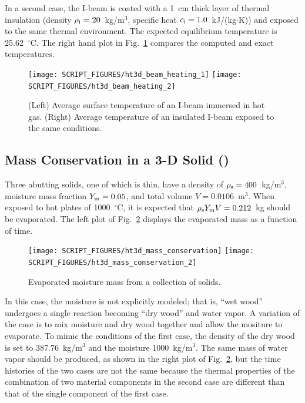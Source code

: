 \documentclass[11pt]{book}
\begin{document}
In a second case, the I-beam is coated with a 1~cm thick layer of thermal insulation (density $\rho_{\rm i}=20$~kg/m$^3$, specific heat $c_{\rm i}=1.0$~kJ/(kg$\cdot$K)) and exposed to the same thermal environment. The expected equilibrium temperature is 25.62~$^\circ$C. The right hand plot in Fig.~\ref{fig:ht3d_beam_heating} compares the computed and exact temperatures.

\begin{figure}[ht]
\texttt{[image: SCRIPT\_FIGURES/ht3d\_beam\_heating\_1]}
\texttt{[image: SCRIPT\_FIGURES/ht3d\_beam\_heating\_2]}
\caption[The  test cases]{(Left) Average surface temperature of an I-beam immersed in hot gas. (Right) Average temperature of an insulated I-beam exposed to the same conditions.}
\label{fig:ht3d_beam_heating}
\end{figure}

\FloatBarrier


\subsection{Mass Conservation in a 3-D Solid (\texorpdfstring{}{ht3d\_mass\_conservation})}
\label{ht3d_mass_conservation}

Three abutting solids, one of which is thin, have a density of $\rho_{\rm s}=400$~kg/m$^3$, moisture mass fraction $Y_{\rm m}=0.05$, and total volume $V=0.0106$~m$^3$. When exposed to hot plates of 1000~$^\circ$C, it is expected that $\rho_{\rm s} Y_{\rm m} V=0.212$~kg should be evaporated. The left plot of Fig.~\ref{fig:ht3d_mass_conservation} displays the evaporated mass as a function of time.

\begin{figure}[ht]
\texttt{[image: SCRIPT\_FIGURES/ht3d\_mass\_conservation]}
\texttt{[image: SCRIPT\_FIGURES/ht3d\_mass\_conservation\_2]}
\caption[The  test case]{Evaporated moisture mass from a collection of solids.}
\label{fig:ht3d_mass_conservation}
\end{figure}

In this case, the moisture is not explicitly modeled; that is, ``wet wood'' undergoes a single reaction becoming ``dry wood'' and water vapor. A variation of the case is to mix moisture and dry wood together and allow the mositure to evaporate. To mimic the conditions of the first case, the density of the dry wood is set to 387.76~kg/m$^3$ and the moisture 1000~kg/m$^3$. The same mass of water vapor should be produced, as shown in the right plot of Fig.~\ref{fig:ht3d_mass_conservation}, but the time histories of the two cases are not the same because the thermal properties of the combination of two material components in the second case are different than that of the single component of the first case.
\end{document}
